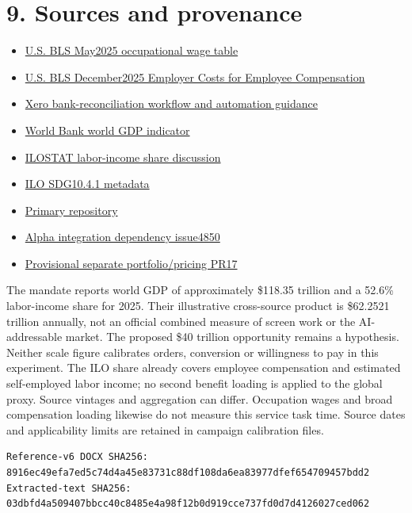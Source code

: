 \documentclass[10pt,letterpaper]{article}
\begin{document}
\section*{9. Sources and provenance}
\begin{itemize}
\item \href{https://www.bls.gov/news.release/ocwage.t01.htm}{U.S. BLS May2025 occupational wage table}
\item \href{https://www.bls.gov/news.release/archives/ecec_03202026.htm}{U.S. BLS December2025 Employer Costs for Employee Compensation}
\item \href{https://www.xero.com/us/guides/how-to-do-bank-reconciliation/}{Xero bank-reconciliation workflow and automation guidance}
\item \href{https://data.worldbank.org/?locations=1W-US}{World Bank world GDP indicator}
\item \href{https://ilostat.ilo.org/blog/the-world-of-work-and-the-2030-agenda-a-ten-year-review/}{ILOSTAT labor-income share discussion}
\item \href{https://unstats.un.org/sdgs/metadata/files/Metadata-10-04-01.pdf}{ILO SDG10.4.1 metadata}
\item \href{https://github.com/MontrealAI/AGI-Alpha-Invention-Flywheel-Lab}{Primary repository}
\item \href{https://github.com/MontrealAI/AGI-Alpha-Agent-v0/issues/4850}{Alpha integration dependency issue4850}
\item \href{https://github.com/MontrealAI/AGI-Alpha-Invention-Flywheel-Lab/pull/17}{Provisional separate portfolio/pricing PR17}
\end{itemize}
The mandate reports world GDP of approximately \$118.35 trillion and a 52.6\% labor-income share for 2025. Their illustrative cross-source product is \$62.2521 trillion annually, not an official combined measure of screen work or the AI-addressable market. The proposed \$40 trillion opportunity remains a hypothesis. Neither scale figure calibrates orders, conversion or willingness to pay in this experiment. The ILO share already covers employee compensation and estimated self-employed labor income; no second benefit loading is applied to the global proxy. Source vintages and aggregation can differ. Occupation wages and broad compensation loading likewise do not measure this service task time. Source dates and applicability limits are retained in campaign calibration files.

\begin{Verbatim}[fontsize=\scriptsize,breaklines=true]
Reference-v6 DOCX SHA256: 8916ec49efa7ed5c74d4a45e83731c88df108da6ea83977dfef654709457bdd2
Extracted-text SHA256: 03dbfd4a509407bbcc40c8485e4a98f12b0d919cce737fd0d7d4126027ced062
\end{Verbatim}
\end{document}

